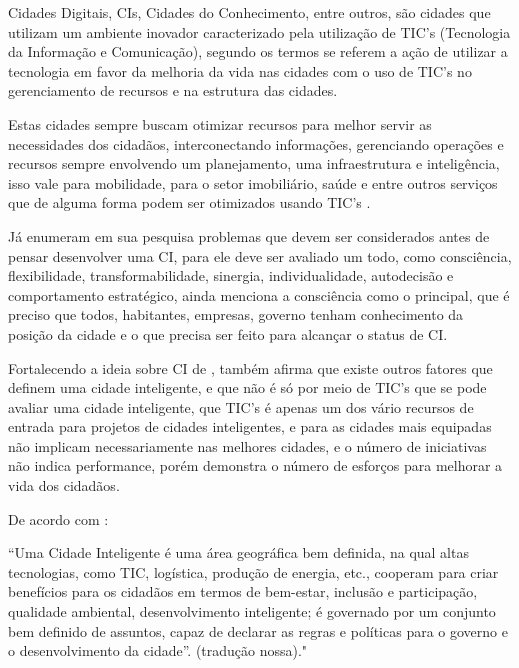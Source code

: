 Cidades Digitais, CIs, Cidades do Conhecimento, entre outros, são cidades que utilizam um ambiente inovador caracterizado pela utilização de TIC’s (Tecnologia da Informação e Comunicação), segundo \cite{yin} os termos se referem a ação de utilizar a tecnologia em favor da melhoria da vida nas cidades com o uso de TIC’s no gerenciamento de recursos e na estrutura das cidades.

Estas cidades sempre buscam otimizar recursos para melhor servir as necessidades dos cidadãos, interconectando informações, gerenciando operações e recursos sempre envolvendo um planejamento, uma infraestrutura e inteligência, isso vale para mobilidade, para o setor imobiliário, saúde e entre outros serviços que de alguma forma podem ser otimizados usando TIC’s \cite{washburn2010helping}.

Já  enumeram em sua pesquisa problemas que devem ser considerados antes de pensar desenvolver uma CI, para ele deve ser avaliado um todo, como consciência, flexibilidade, transformabilidade, sinergia, individualidade, autodecisão e comportamento estratégico, \cite{giffinger} ainda menciona a consciência como o principal, que é preciso que todos, habitantes, empresas, governo tenham conhecimento da posição da cidade e o que precisa ser feito para alcançar o status de CI.

Fortalecendo a ideia sobre CI de , também afirma que existe outros fatores que definem uma cidade inteligente, e que não é só por meio de TIC’s que se pode avaliar uma cidade inteligente, que TIC’s é apenas um dos vário recursos de entrada para projetos de cidades inteligentes, e para  as cidades mais equipadas não implicam necessariamente nas melhores cidades, e o número de iniciativas não indica performance, porém demonstra o número de esforços para melhorar a vida dos cidadãos.

De acordo com : 

\begin{citacao}
“Uma Cidade Inteligente é uma área geográfica bem definida, na qual altas tecnologias, como TIC, logística, produção de energia, etc., cooperam para criar benefícios para os cidadãos em termos de bem-estar, inclusão e participação, qualidade ambiental, desenvolvimento inteligente; é governado por um conjunto bem definido de assuntos, capaz de declarar as regras e políticas para o governo e o desenvolvimento da cidade”. (tradução nossa)."
\end{citacao}

